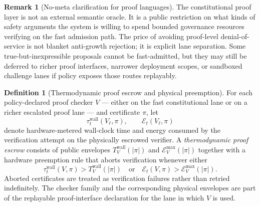 \documentclass[11pt]{article}
\theoremstyle{definition}
\newtheorem{definition}[theorem]{Definition}
\newtheorem{remark}[theorem]{Remark}
\newcommand{\1}{\mathbf{1}}
\begin{document}
\begin{remark}[No-meta clarification for proof languages]
The constitutional proof layer is not an external semantic oracle. It is a public restriction on what kinds of safety arguments the system is willing to spend bounded governance resources verifying on the fast admission path. The price of avoiding proof-level denial-of-service is not blanket anti-growth rejection; it is explicit lane separation. Some true-but-inexpressible proposals cannot be fast-admitted, but they may still be deferred to richer proof interfaces, narrower deployment scopes, or sandboxed challenge lanes if policy exposes those routes replayably.
\end{remark}
\begin{definition}[Thermodynamic proof escrow and physical preemption]\label{def:thermo_escrow}
For each policy-declared proof checker $V$ --- either on the fast constitutional lane or on a richer escalated proof lane --- and certificate $\pi$, let
\[
\tau_t^{\mathrm{wall}}(V_\ell,\pi),
\qquad
\mathcal E_t(V_\ell,\pi)
\]
denote hardware-metered wall-clock time and energy consumed by the verification attempt on the physically escrowed verifier. A \emph{thermodynamic proof escrow} consists of public envelopes $T_{V}^{\mathrm{wall}}(|\pi|)$ and $\mathcal E_V^{\max}(|\pi|)$ together with a hardware preemption rule that aborts verification whenever either
\[
\tau_t^{\mathrm{wall}}(V,\pi) > T_{V}^{\mathrm{wall}}(|\pi|)
\quad\text{or}\quad
\mathcal E_t(V,\pi) > \mathcal E_V^{\max}(|\pi|).
\]
Aborted certificates are treated as verification failures rather than retried indefinitely. The checker family and the corresponding physical envelopes are part of the replayable proof-interface declaration for the lane in which $V$ is used.
\end{definition}
\end{document}
